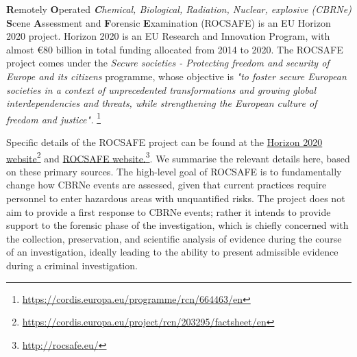 \textbf{R}emotely \textbf{O}perated \textit{\textbf{C}hemical, Biological, Radiation, Nuclear, explosive (CBRNe)} \textbf{S}cene \textbf{A}ssessment and \textbf{F}orensic \textbf{E}xamination (ROCSAFE) is an EU Horizon 2020 project. Horizon 2020 is an EU Research and Innovation Program, with almost €80 billion in total funding allocated from 2014 to 2020. The ROCSAFE project comes under the \textit{Secure societies - Protecting freedom and security of Europe and its citizens} programme, whose objective is \textit{"to foster secure European societies in a context of unprecedented transformations and growing global interdependencies and threats, while strengthening the European culture of freedom and justice".}
\href{https://cordis.europa.eu/programme/rcn/664463/en}{ }\footnote{\href {https://cordis.europa.eu/programme/rcn/664463/en}{https://cordis.europa.eu/programme/rcn/664463/en}}

Specific details of the ROCSAFE project can be found at the \href{https://cordis.europa.eu/project/rcn/203295/factsheet/en}{Horizon 2020 website}\footnote{\href {https://cordis.europa.eu/project/rcn/203295/factsheet/en}{https://cordis.europa.eu/project/rcn/203295/factsheet/en}} 
and 
\href{http://rocsafe.eu/}{ROCSAFE website.}\footnote{\href {http://rocsafe.eu/}{http://rocsafe.eu/}}. We summarise the relevant details here, based on these primary sources. The high-level goal of ROCSAFE is to fundamentally change how CBRNe events are assessed, given that current practices require personnel to enter hazardous areas with unquantified risks. The project does not aim to provide a first response to CBRNe events; rather it intends to provide support to the forensic phase of the investigation, which is chiefly concerned with the collection, preservation, and scientific analysis of evidence during the course of an investigation, ideally leading to the ability to present admissible evidence during a criminal investigation. 


